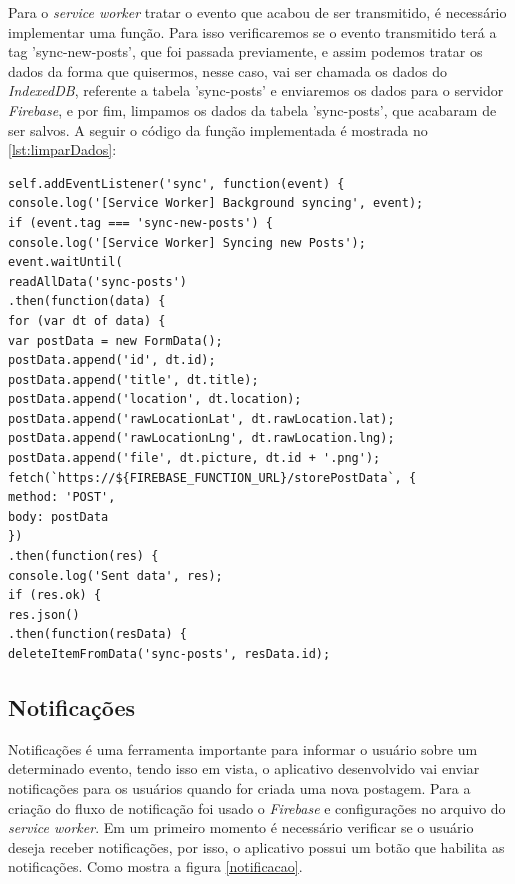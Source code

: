 Para o \textit{service worker} tratar o evento que acabou de ser transmitido, é necessário implementar uma função. Para isso verificaremos se o evento transmitido terá a tag 'sync-new-posts', que foi passada previamente, e assim podemos tratar os dados da forma que quisermos, nesse caso, vai ser chamada os dados do \textit{IndexedDB}, referente a tabela 'sync-posts' e enviaremos os dados para o servidor \textit{Firebase}, e por fim, limpamos os dados da tabela 'sync-posts', que acabaram de ser salvos. A seguir o código da função implementada é mostrada no \autoref{lst:limparDados}:

\begin{lstlisting}[frame=single,label=lst:limparDados,caption=Limpando Dados, basicstyle=\footnotesize]
self.addEventListener('sync', function(event) {
console.log('[Service Worker] Background syncing', event);
if (event.tag === 'sync-new-posts') {
console.log('[Service Worker] Syncing new Posts');
event.waitUntil(
readAllData('sync-posts')
.then(function(data) {
for (var dt of data) {
var postData = new FormData();
postData.append('id', dt.id);
postData.append('title', dt.title);
postData.append('location', dt.location);
postData.append('rawLocationLat', dt.rawLocation.lat);
postData.append('rawLocationLng', dt.rawLocation.lng);
postData.append('file', dt.picture, dt.id + '.png');
fetch(`https://${FIREBASE_FUNCTION_URL}/storePostData`, {
method: 'POST',
body: postData
})
.then(function(res) {
console.log('Sent data', res);
if (res.ok) {
res.json()
.then(function(resData) {
deleteItemFromData('sync-posts', resData.id);

\end{lstlisting}
\vspace{-0.75cm}
\begin{center}
\end{center}

\subsection{Notificações}
Notificações é uma ferramenta importante para informar o usuário sobre um determinado evento, tendo isso em vista, o aplicativo desenvolvido vai enviar notificações para os usuários quando for criada uma nova postagem. Para a criação do fluxo de notificação foi usado o \textit{Firebase} e configurações no arquivo do \textit{service worker}. Em um primeiro momento é necessário verificar se o usuário deseja receber notificações, por isso, o aplicativo possui um botão que habilita as notificações. Como mostra a figura \autoref{notificacao}.

